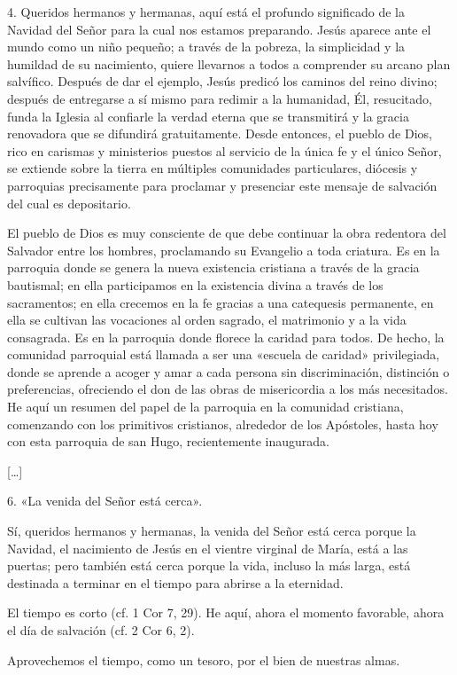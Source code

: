 \documentclass[]{article}
\begin{document}
4. Queridos hermanos y hermanas, aquí está el profundo significado de la
Navidad del Señor para la cual nos estamos preparando. Jesús aparece
ante el mundo como un niño pequeño; a través de la pobreza, la
simplicidad y la humildad de su nacimiento, quiere llevarnos a todos a
comprender su arcano plan salvífico. Después de dar el ejemplo, Jesús
predicó los caminos del reino divino; después de entregarse a sí mismo
para redimir a la humanidad, Él, resucitado, funda la Iglesia al
confiarle la verdad eterna que se transmitirá y la gracia renovadora que
se difundirá gratuitamente. Desde entonces, el pueblo de Dios, rico en
carismas y ministerios puestos al servicio de la única fe y el único
Señor, se extiende sobre la tierra en múltiples comunidades
particulares, diócesis y parroquias precisamente para proclamar y
presenciar este mensaje de salvación del cual es depositario.

El pueblo de Dios es muy consciente de que debe continuar la obra
redentora del Salvador entre los hombres, proclamando su Evangelio a
toda criatura. Es en la parroquia donde se genera la nueva existencia
cristiana a través de la gracia bautismal; en ella participamos en la
existencia divina a través de los sacramentos; en ella crecemos en la fe
gracias a una catequesis permanente, en ella se cultivan las vocaciones
al orden sagrado, el matrimonio y a la vida consagrada. Es en la
parroquia donde florece la caridad para todos. De hecho, la comunidad
parroquial está llamada a ser una «escuela de caridad» privilegiada,
donde se aprende a acoger y amar a cada persona sin discriminación,
distinción o preferencias, ofreciendo el don de las obras de
misericordia a los más necesitados. He aquí un resumen del papel de la
parroquia en la comunidad cristiana, comenzando con los primitivos
cristianos, alrededor de los Apóstoles, hasta hoy con esta parroquia de
san Hugo, recientemente inaugurada.

{[}\ldots{}{]}

6. «La venida del Señor está cerca».

Sí, queridos hermanos y hermanas, la venida del Señor está cerca porque
la Navidad, el nacimiento de Jesús en el vientre virginal de María, está
a las puertas; pero también está cerca porque la vida, incluso la más
larga, está destinada a terminar en el tiempo para abrirse a la
eternidad.

El tiempo es corto (cf. 1 Cor 7, 29). He aquí, ahora el momento
favorable, ahora el día de salvación (cf. 2 Cor 6, 2).

Aprovechemos el tiempo, como un tesoro, por el bien de nuestras almas.
\end{document}
